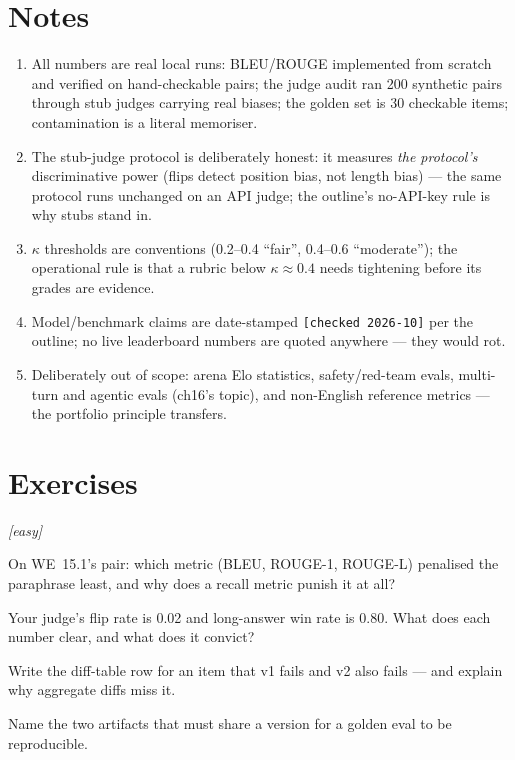 \section*{Notes}
\begin{enumerate}
\item[\textbf{1.}] All numbers are real local runs: BLEU/ROUGE
implemented from scratch and verified on hand-checkable pairs; the
judge audit ran 200 synthetic pairs through stub judges carrying real
biases; the golden set is 30 checkable items; contamination is a
literal memoriser.
\item[\textbf{2.}] The stub-judge protocol is deliberately honest:
it measures \emph{the protocol's} discriminative power (flips detect
position bias, not length bias) --- the same protocol runs unchanged
on an API judge; the outline's no-API-key rule is why stubs stand in.
\item[\textbf{3.}] $\kappa$ thresholds are conventions (0.2--0.4
``fair'', 0.4--0.6 ``moderate''); the operational rule is that a
rubric below $\kappa \approx 0.4$ needs tightening before its grades
are evidence.
\item[\textbf{4.}] Model/benchmark claims are date-stamped
\texttt{[checked 2026-10]} per the outline; no live leaderboard
numbers are quoted anywhere --- they would rot.
\item[\textbf{5.}] Deliberately out of scope: arena Elo statistics,
safety/red-team evals, multi-turn and agentic evals (ch16's topic),
and non-English reference metrics --- the portfolio principle
transfers.
\end{enumerate}

\section{Exercises}
\label{sec:lmex}

\emph{[easy]}
\begin{exercise}
On WE~15.1's pair: which metric (BLEU, ROUGE-1, ROUGE-L) penalised
the paraphrase least, and why does a recall metric punish it at all?
\end{exercise}
\begin{exercise}
Your judge's flip rate is 0.02 and long-answer win rate is 0.80.
What does each number clear, and what does it convict?
\end{exercise}
\begin{exercise}
Write the diff-table row for an item that v1 fails and v2 also fails
--- and explain why aggregate diffs miss it.
\end{exercise}
\begin{exercise}
Name the two artifacts that must share a version for a golden eval
to be reproducible.
\end{exercise}

